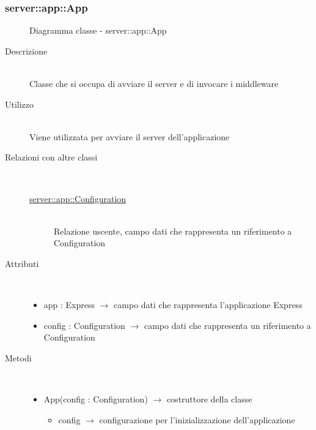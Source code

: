 \subsubsection[App]{server::app::App}
\begin{figure}[H]
	\centering
	\caption{Diagramma classe - server::app::App}
\end{figure}\begin{description}
\item[Descrizione] \hfill \\
Classe che si occupa di avviare il server e di invocare i middleware
\item[Utilizzo] \hfill \\
Viene utilizzata per avviare il server dell'applicazione
\item[Relazioni con altre classi] \hfill \\
\vspace{-7mm}
\begin{description}
	\item[\hyperlink{server::app::Configuration}{server::app::Configuration}] \hfill \\
	Relazione uscente, campo dati che rappresenta un riferimento a Configuration
\end{description}

\item[Attributi] \hfill \\
\vspace{-7mm}
\begin{itemize}
	\item app : Express $\rightarrow$ campo dati che rappresenta l'applicazione Express
	\item config : Configuration $\rightarrow$ campo dati che rappresenta un riferimento a Configuration
\end{itemize}

\item[Metodi] \hfill \\
\vspace{-7mm}
\begin{itemize}
	\item App(config : Configuration) $\rightarrow$ costruttore della classe\begin{itemize}
		\item config $\rightarrow$ configurazione per l'inizializzazione dell'applicazione
	\end{itemize}
	

\end{itemize}
\end{description}
